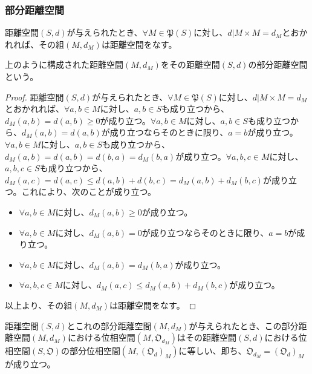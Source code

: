 \documentclass[dvipdfmx]{jsarticle}
\begin{document}
\subsubsection{部分距離空間}%
\begin{thm}\label{8.2.1.17}
距離空間$(S,d)$が与えられたとき、$\forall M \in \mathfrak{P}(S)$に対し、$d|M \times M = d_{M}$とおかれれば、その組$\left( M,d_{M} \right)$は距離空間をなす。
\end{thm}
\begin{dfn}
上のように構成された距離空間$\left( M,d_{M} \right)$をその距離空間$(S,d)$の部分距離空間という。
\end{dfn}
\begin{proof}
距離空間$(S,d)$が与えられたとき、$\forall M \in \mathfrak{P}(S)$に対し、$d|M \times M = d_{M}$とおかれれば、$\forall a,b \in M$に対し、$a,b \in S$も成り立つから、$d_{M}(a,b) = d(a,b) \geq 0$が成り立つ。$\forall a,b \in M$に対し、$a,b \in S$も成り立つから、$d_{M}(a,b) = d(a,b)$が成り立つならそのときに限り、$a = b$が成り立つ。$\forall a,b \in M$に対し、$a,b \in S$も成り立つから、$d_{M}(a,b) = d(a,b) = d(b,a) = d_{M}(b,a)$が成り立つ。$\forall a,b,c \in M$に対し、$a,b,c \in S$も成り立つから、$d_{M}(a,c) = d(a,c) \leq d(a,b) + d(b,c) = d_{M}(a,b) + d_{M}(b,c)$が成り立つ。これにより、次のことが成り立つ。
\begin{itemize}
\item
  $\forall a,b \in M$に対し、$d_{M}(a,b) \geq 0$が成り立つ。
\item
  $\forall a,b \in M$に対し、$d_{M}(a,b) = 0$が成り立つならそのときに限り、$a = b$が成り立つ。
\item
  $\forall a,b \in M$に対し、$d_{M}(a,b) = d_{M}(b,a)$が成り立つ。
\item
  $\forall a,b,c \in M$に対し、$d_{M}(a,c) \leq d_{M}(a,b) + d_{M}(b,c)$が成り立つ。
\end{itemize}
以上より、その組$\left( M,d_{M} \right)$は距離空間をなす。
\end{proof}
\begin{thm}\label{8.2.1.18}
距離空間$(S,d)$とこれの部分距離空間$\left( M,d_{M} \right)$が与えられたとき、この部分距離空間$\left( M,d_{M} \right)$における位相空間$\left( M,\mathfrak{O}_{d_{M}} \right)$はその距離空間$(S,d)$における位相空間$\left( S,\mathfrak{O} \right)$の部分位相空間$\left( M,\left( \mathfrak{O}_{d} \right)_{M} \right)$に等しい、即ち、$\mathfrak{O}_{d_{M}} = \left( \mathfrak{O}_{d} \right)_{M}$が成り立つ。
\end{thm}
\end{document}
